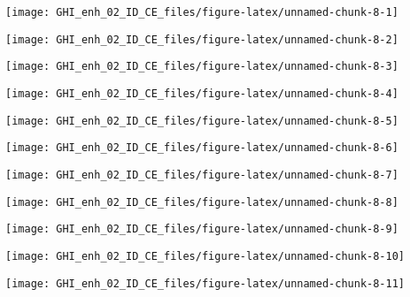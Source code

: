 \documentclass[
  10pt,
  a4paper,oneside]{article}
\begin{document}
\begin{center}\texttt{[image: GHI\_enh\_02\_ID\_CE\_files/figure-latex/unnamed-chunk-8-1]} \end{center}

\begin{center}\texttt{[image: GHI\_enh\_02\_ID\_CE\_files/figure-latex/unnamed-chunk-8-2]} \end{center}

\begin{center}\texttt{[image: GHI\_enh\_02\_ID\_CE\_files/figure-latex/unnamed-chunk-8-3]} \end{center}

\begin{center}\texttt{[image: GHI\_enh\_02\_ID\_CE\_files/figure-latex/unnamed-chunk-8-4]} \end{center}

\begin{center}\texttt{[image: GHI\_enh\_02\_ID\_CE\_files/figure-latex/unnamed-chunk-8-5]} \end{center}

\begin{center}\texttt{[image: GHI\_enh\_02\_ID\_CE\_files/figure-latex/unnamed-chunk-8-6]} \end{center}

\begin{center}\texttt{[image: GHI\_enh\_02\_ID\_CE\_files/figure-latex/unnamed-chunk-8-7]} \end{center}

\begin{center}\texttt{[image: GHI\_enh\_02\_ID\_CE\_files/figure-latex/unnamed-chunk-8-8]} \end{center}

\begin{center}\texttt{[image: GHI\_enh\_02\_ID\_CE\_files/figure-latex/unnamed-chunk-8-9]} \end{center}

\begin{center}\texttt{[image: GHI\_enh\_02\_ID\_CE\_files/figure-latex/unnamed-chunk-8-10]} \end{center}

\begin{center}\texttt{[image: GHI\_enh\_02\_ID\_CE\_files/figure-latex/unnamed-chunk-8-11]} \end{center}
\end{document}
